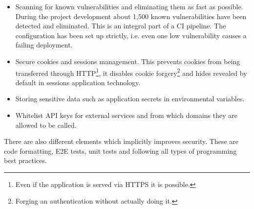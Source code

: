 \documentclass{article} %
\begin{document}
\begin{itemize}
    \item Scanning for known vulnerabilities and eliminating them as fast as possible. During the project development about 1,500 known vulnerabilities have been detected and eliminated. This is an integral part of a CI pipeline. The configuration has been set up strictly, i.e. even one low vulnerability causes a failing deployment.
    \item Secure cookies and sessions management. This prevents cookies from being transferred through HTTP\footnote{Even if the application is served via HTTPS it is possible.}, it disables cookie forgery\footnote{Forging an authentication without actually doing it.} and hides revealed by default in sessions application technology.
    \item Storing sensitive data such as application secrets in environmental variables.
    \item Whitelist API keys for external services and from which domains they are allowed to be called.
\end{itemize}
There are also different elements which implicitly improves security. These are code formatting, E2E tests, unit tests and following all types of programming best practices.
\end{document}
